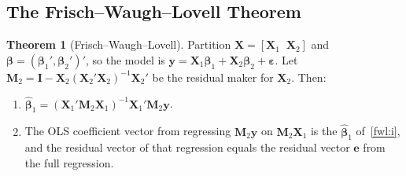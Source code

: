 \documentclass[12pt,a4paper]{article}
\theoremstyle{definition}
\newtheorem{theorem}{Theorem}[section]
\newcommand{\bX}{\mathbf{X}}
\newcommand{\by}{\mathbf{y}}
\def\bb{\boldsymbol{\beta}}
\newcommand{\be}{\boldsymbol{\varepsilon}}
\newcommand{\bI}{\mathbf{I}}
\newcommand{\bM}{\mathbf{M}}
\begin{document}
\subsection{The Frisch--Waugh--Lovell Theorem}

\begin{theorem}[Frisch--Waugh--Lovell]\label{thm:fwl}
Partition $\bX = [\bX_1 \;\; \bX_2]$ and $\bb = (\bb_1', \bb_2')'$, so the model is $\by = \bX_1\bb_1 + \bX_2\bb_2 + \be$. Let $\bM_2 = \bI - \bX_2(\bX_2'\bX_2)^{-1}\bX_2'$ be the residual maker for $\bX_2$. Then:
\begin{enumerate}[label=\textup{(\roman*)}]
\item\label{fwl:i} $\hat{\bb}_1 = (\bX_1'\bM_2\bX_1)^{-1}\bX_1'\bM_2\by$.
\item The OLS coefficient vector from regressing $\bM_2\by$ on $\bM_2\bX_1$ is the $\hat{\bb}_1$ of~\ref{fwl:i}, and the residual vector of that regression equals the residual vector $\mathbf{e}$ from the full regression.
\end{enumerate}
\end{theorem}
\end{document}
